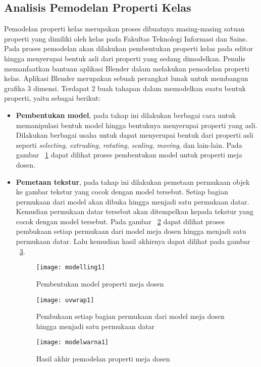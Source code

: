 \subsection{Analisis Pemodelan Properti Kelas}
\label{sec:pemodelanproperti}
Pemodelan properti kelas merupakan proses dibuatnya masing-masing satuan properti yang dimiliki oleh kelas pada Fakultas Teknologi Informasi dan Sains. Pada proses pemodelan akan dilakukan pembentukan properti kelas pada editor hingga menyerupai bentuk asli dari properti yang sedang dimodelkan. Penulis memanfaatkan bantuan aplikasi Blender dalam melakukan pemodelan properti kelas. Aplikasi Blender merupakan sebuah perangkat lunak untuk membangun grafika 3 dimensi. Terdapat 2 buah tahapan dalam memodelkan suatu bentuk properti, yaitu sebagai berikut:
\begin{itemize}
	\item {\bf Pembentukan model}, pada tahap ini dilakukan berbagai cara untuk memanipulasi bentuk model hingga bentuknya menyerupai properti yang asli. Dilakukan berbagai usaha untuk dapat menyerupai bentuk dari properti asli seperti {\it selecting, extruding, rotating, scaling, moving}, dan lain-lain. Pada gambar ~\ref{fig:modelling1} dapat dilihat proses pembentukan model untuk properti meja dosen.
	\item {\bf Pemetaan tekstur}, pada tahap ini dilakukan pemetaan permukaan objek ke gambar tekstur yang cocok dengan model tersebut. Setiap bagian permukaan dari model akan dibuka hingga menjadi satu permukaan datar. Kemudian permukaan datar tersebut akan ditempelkan kepada tekstur yang cocok dengan model tersebut. Pada gambar ~\ref{fig:uvwrap1} dapat dilihat proses pembukaan setiap permukaan dari model meja dosen hingga menjadi satu permukaan datar. Lalu kemudian hasil akhirnya dapat dilihat pada gambar ~\ref{fig:modelwarna1}.
	\begin{figure}
		\centering
		\texttt{[image: modelling1]}
		\caption{Pembentukan model properti meja dosen}
		\label{fig:modelling1}
	\end{figure}
	\begin{figure}
		\centering
		\texttt{[image: uvwrap1]}
		\caption{Pembukaan setiap bagian permukaan dari model meja dosen hingga menjadi satu permukaan datar}
		\label{fig:uvwrap1}
	\end{figure}
	\begin{figure}
		\centering
		\texttt{[image: modelwarna1]}
		\caption{Hasil akhir pemodelan properti meja dosen}
		\label{fig:modelwarna1}
	\end{figure}
\end{itemize}

